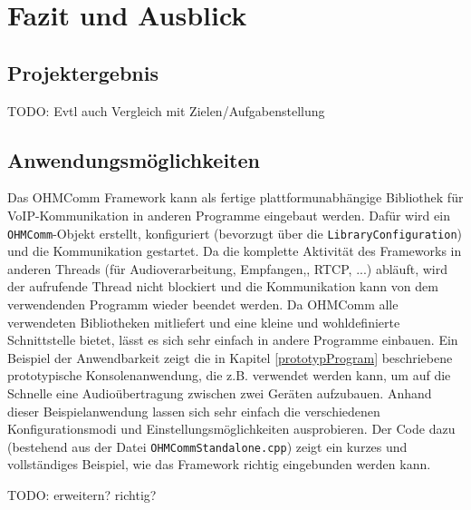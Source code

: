 \chapter{Fazit und Ausblick}
\section{Projektergebnis}
TODO: Evtl auch Vergleich mit Zielen/Aufgabenstellung
\section{Anwendungsmöglichkeiten}
Das OHMComm Framework kann als fertige plattformunabhängige Bibliothek für VoIP-Kommunikation in anderen Programme eingebaut werden. Dafür wird ein \texttt{OHMComm}-Objekt erstellt, konfiguriert (bevorzugt über die \texttt{LibraryConfiguration}) und die Kommunikation gestartet. Da die komplette Aktivität des Frameworks in anderen Threads (für Audioverarbeitung, Empfangen,, RTCP, ...) abläuft, wird der aufrufende Thread nicht blockiert und die Kommunikation kann von dem verwendenden Programm wieder beendet werden. Da OHMComm alle verwendeten Bibliotheken mitliefert und eine kleine und wohldefinierte Schnittstelle bietet, lässt es sich sehr einfach in andere Programme einbauen.
Ein Beispiel der Anwendbarkeit zeigt die in Kapitel \ref{prototypProgram} beschriebene prototypische Konsolenanwendung, die z.B. verwendet werden kann, um auf die Schnelle eine Audioübertragung zwischen zwei Geräten aufzubauen. Anhand dieser Beispielanwendung lassen sich sehr einfach die verschiedenen Konfigurationsmodi und Einstellungsmöglichkeiten ausprobieren. Der Code dazu (bestehend aus der Datei \texttt{OHMCommStandalone.cpp}) zeigt ein kurzes und vollständiges Beispiel, wie das Framework richtig eingebunden werden kann.

TODO: erweitern? richtig?
